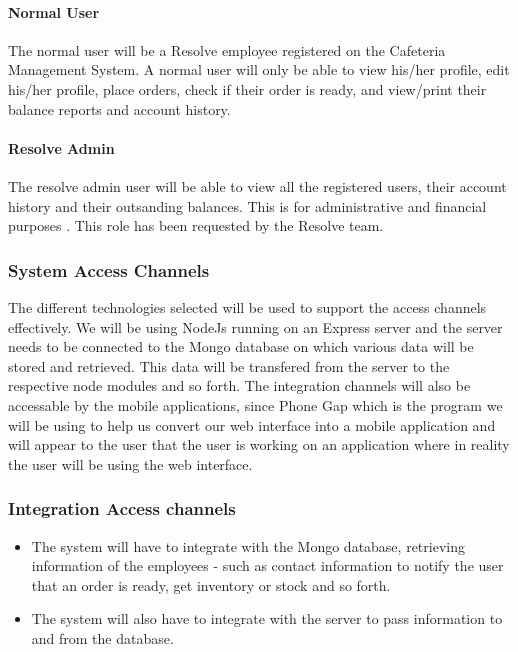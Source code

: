 \documentclass[12pt]{article}
\begin{document}
\paragraph{ Normal User\\}
The normal user will be a Resolve employee registered on the Cafeteria Management System.  A normal user will only be able to view his/her profile, edit his/her profile, place orders, check if their order is ready, and view/print their balance reports and account history.

\paragraph{ Resolve Admin\\}
The resolve admin user will be able to view all the registered users, their account history and their outsanding balances. This is for administrative and financial purposes . This role has been requested by the Resolve team.

\subsubsection{System Access Channels}
The different technologies selected will be used to support the access channels effectively. We will be using NodeJs running on an Express server and the server needs to be connected to the Mongo database on which various data will be stored and retrieved. This data will be transfered from the server to the respective node modules and so forth. 
The integration channels will also be accessable by the mobile applications, since Phone Gap which is the program we will be using to help us convert our web interface into a mobile application and will appear to the user that the user is working on an application where in reality the user will be using the web interface. 

\subsubsection{Integration Access channels}

\begin{itemize}

\item The system will have to integrate with the Mongo database, retrieving information of the employees - such as contact information to notify the user that an order is ready, get inventory or stock and so forth. 

\item The system will also have to integrate with the server to pass information to and from the database.
\end{itemize}
\end{document}
